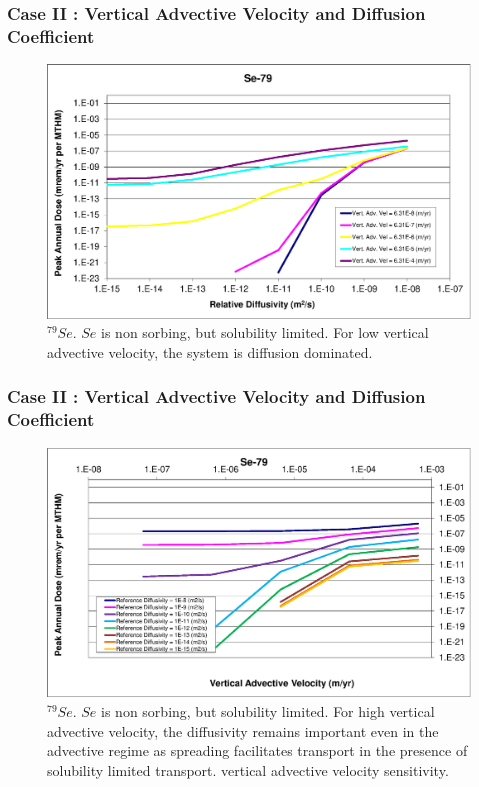 \begin{frame}[c]
  \frametitle{Case II : Vertical Advective Velocity and Diffusion Coefficient}
\begin{figure}[htp!]
\centering
\includegraphics[width=\linewidth]{AdvVelAndDiffCoeffEBSFail/Se-79.eps}
\caption{$^{79}Se$.
$Se$ is non sorbing, but solubility limited.  
For low vertical advective velocity, 
the system is diffusion dominated.}
\label{fig:VAdvVelSe79}
\end{figure}
\end{frame}

\begin{frame}[c]
  \frametitle{Case II : Vertical Advective Velocity and Diffusion Coefficient}
\begin{figure}[ht!]
\centering
\includegraphics[width=\linewidth]{AdvVelAndDiffCoeffEBSFail/Se-79-VAdvVel.eps}
\caption{$^{79}Se$.
$Se$ is non sorbing, but solubility limited.  
For high vertical advective 
velocity, the diffusivity remains important even in the advective regime as 
spreading facilitates transport in the presence of solubility limited transport. 
vertical advective velocity sensitivity.}
\label{fig:VAdvVelSe79VAdvVel}
\end{figure}
\end{frame}

